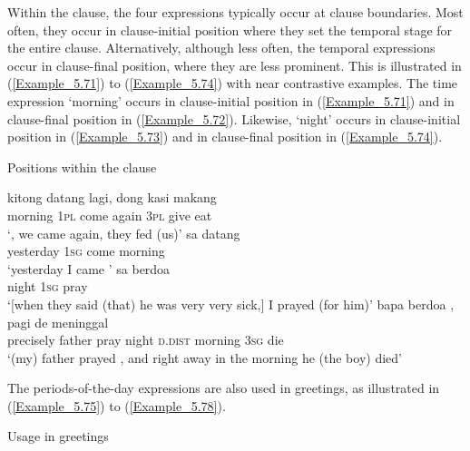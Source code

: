 Within the clause, the four expressions typically occur at clause boundaries. Most often, they occur in clause-initial position where they set the temporal stage for the entire clause. Alternatively, although less often, the temporal expressions occur in clause-final position, where they are less prominent. This is illustrated in (\ref{Example_5.71}) to (\ref{Example_5.74}) with near contrastive examples. The time expression  ‘morning’ occurs in clause-initial position in (\ref{Example_5.71}) and in clause-final position in (\ref{Example_5.72}). Likewise,  ‘night’ occurs in clause-initial position in (\ref{Example_5.73}) and in clause-final position in (\ref{Example_5.74}).


\begin{styleExampleTitle}
Positions within the clause
\end{styleExampleTitle}
\ea
\label{Example_5.71}
 {kitong} {datang} {lagi}, {dong} {kasi} {makang}\\ %
 morning  \textsc{1pl}  come  again  \textsc{3pl}  give  eat\\
 ‘, we came again, they fed (us)’ \textstyleExampleSource{[081025-009a-Cv.0024]}
\z
\ea
\label{Example_5.72}
 {sa} {datang} {}\\ %
 yesterday  \textsc{1sg}  come  morning\\
\glt 
‘yesterday I came ’ \textstyleExampleSource{[080922-002-Cv.0021]}
\z
\ea
\label{Example_5.73}
\gll {{\ldots}} {} {sa} {berdoa}\\ %
 { }   night  \textsc{1sg}  pray\\
\glt 
‘[when they said (that) he was very very sick,]  I prayed (for him)’ \textstyleExampleSource{[080923-015-CvEx.0010]}
\z
\ea
\label{Example_5.74}
 {bapa} {berdoa} {} {,} {pagi} {de} {meninggal}\\ %
 precisely  father  pray  night  \textsc{d.dist}  morning  \textsc{3sg}  die\\
\glt 
‘(my) father prayed , and right away in the morning he (the boy) died’ \textstyleExampleSource{[081025-009b-Cv.0039]}
\z


The periods-of-the-day expressions are also used in greetings, as illustrated in (\ref{Example_5.75}) to (\ref{Example_5.78}).


\begin{styleExampleTitle}
Usage in greetings
\end{styleExampleTitle}

